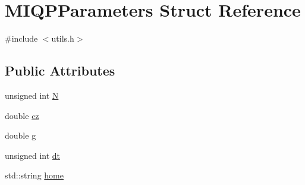 \hypertarget{structMIQPParameters}{\section{\-M\-I\-Q\-P\-Parameters \-Struct \-Reference}
\label{structMIQPParameters}
}


{\ttfamily \#include $<$utils.\-h$>$}

\subsection*{\-Public \-Attributes}
\begin{DoxyCompactItemize}
\item 
unsigned int \hyperlink{structMIQPParameters_a7545bc29708292cbfca22b0446180f7c}{\-N}
\item 
double \hyperlink{structMIQPParameters_ab8158e2bf119d70c9856b6a277e3c42a}{cz}
\item 
double \hyperlink{structMIQPParameters_a31eca71d200b5b1468bd60b3266d0688}{g}
\item 
unsigned int \hyperlink{structMIQPParameters_ab4fca30503423e047dc55d27f0c9f3c9}{dt}
\item 
std\-::string \hyperlink{structMIQPParameters_a351843e2933021d2ed3abb00a9d001ff}{home}
\end{DoxyCompactItemize}


